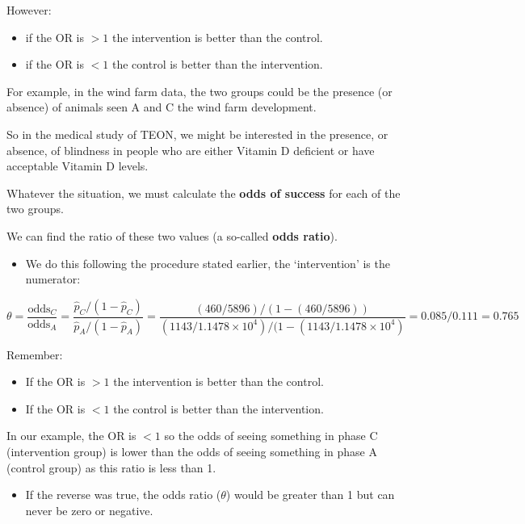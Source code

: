 \documentclass[
  oneside]{krantz}
\providecommand{\tightlist}{%
  \setlength{\itemsep}{0pt}\setlength{\parskip}{0pt}}
\begin{document}
However:

\begin{itemize}
\item
  if the OR is \(> 1\) the intervention is better than the control.
\item
  if the OR is \(< 1\) the control is better than the intervention.
\end{itemize}

For example, in the wind farm data, the two groups could be the presence (or absence) of animals seen A and C the wind farm development.

So in the medical study of TEON, we might be interested in the presence, or absence, of blindness in people who are either Vitamin D deficient or have acceptable Vitamin D levels.

Whatever the situation, we must calculate the \textbf{odds of success} for each of the two groups.

We can find the ratio of these two values (a so-called \textbf{odds ratio}).

\begin{itemize}
\tightlist
\item
  We do this following the procedure stated earlier, the `intervention' is the numerator:
\end{itemize}

\[\theta=\frac{\text{odds}_C}{\text{odds}_A}=\frac{\hat{p}_C/(1-\hat{p}_C)}{\hat{p}_A/(1-\hat{p}_A)}=\frac{(460 / 5896) / (1-(460/ 5896))}{(1143 / \ensuremath{1.1478\times 10^{4}}) / (1-(1143 / \ensuremath{1.1478\times 10^{4}})}= 0.085/ 0.111= 0.765\]

Remember:

\begin{itemize}
\item
  If the OR is \(> 1\) the intervention is better than the control.
\item
  If the OR is \(< 1\) the control is better than the intervention.
\end{itemize}

In our example, the OR is \(<1\) so the odds of seeing something in phase C (intervention group) is lower than the odds of seeing something in phase A (control group) as this ratio is less than 1.

\begin{itemize}
\tightlist
\item
  If the reverse was true, the odds ratio (\(\theta\)) would be greater than 1 but can never be zero or negative.
\end{itemize}
\end{document}
